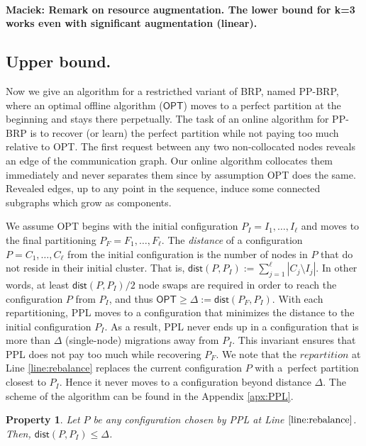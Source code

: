 \documentclass[manuscript,screen=true, review, anonymous]{acmart}
\newcommand{\OPT}{\textsf{OPT}\xspace}
\newcommand{\PPL}{\textsf{PPL}\xspace}
\newcommand{\OBRP}{BRP}
\newcommand{\PPOBRP}{PP-BRP}
\newcommand{\dist}{\textsf{dist}}
\newtheorem{property}{Property}
\newcommand\maciek[1]{\color{brown}\textbf{\\ Maciek: #1}\color{black}}
\begin{document}
\maciek{Remark on resource augmentation. The lower bound for k=3 works even with significant augmentation (linear).}

\subsection{Upper bound.}
Now we give an algorithm for a restricthed variant of  \OBRP{}, named \PPOBRP{},
where an optimal offline algorithm ($\OPT$) moves to a perfect partition
at the beginning and stays there perpetually.
The task of an online algorithm for \PPOBRP{} is to recover (or learn) the perfect partition while not paying too much relative to \OPT.
%
The first request between any two non-collocated nodes reveals an edge of the communication graph.
Our online algorithm collocates them immediately and never separates them since by assumption \OPT does the same.
Revealed edges, up to any point in the sequence,
induce some connected subgraphs which grow as components.

We assume \OPT begins with the initial configuration
$P_I = I_1, \dots, I_{\ell}$ and moves to the final partitioning
$P_F = F_1, \dots, F_{\ell}$.
 The \emph{distance} of a configuration $P = C_1, \dots, C_{\ell}$ from the initial configuration is the number of nodes in $P$ that do not reside in their initial cluster.
    That is,
    $\dist(P, P_I) := \sum_{j=1}^{\ell} | C_j \setminus I_j |$. 
In other words,
at least $\dist(P, P_I)/2$ node swaps are required in order to reach the configuration $P$ from $P_I$, and thus
$\OPT \geq \Delta:= \dist(P_F, P_I) $.
 With each repartitioning,
  \PPL moves to a configuration that minimizes the distance to the initial configuration $P_I$.
As a result,
\PPL never ends up in a configuration that is more than $\Delta$ (single-node) migrations away from $P_I$.
This invariant ensures that \PPL does not pay too much while recovering $P_F$.
      We note that the $\mathit{repartition}$ at Line \ref{line:rebalance} replaces the current configuration $P$ with a~perfect partition closest to $P_I$.
Hence it never moves to a configuration beyond distance $\Delta$.
The scheme of the algorithm can be found in the Appendix \ref{apx:PPL}.  
\begin{property} \label{prop:dist<OPT}
    Let $P$ be any configuration chosen by \PPL at Line $\ref{line:rebalance}$.
    Then, $\dist(P,P_I) \leq \Delta$.
\end{property}
\end{document}
